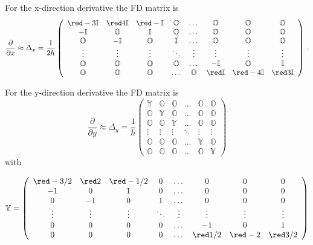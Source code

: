 For the x-direction derivative the FD matrix is
\begin{equation} \label{eq_FDmatrix_der1_y}
	\frac{\partial }{\partial x} \approx \Delta_x= \frac{1}{2h}\left(\begin{array}{cccccccc}
		\red -3\mathbb{I} & \red 4\mathbb{I} & \red-\mathbb{I}& \mathbb{O}& \dots&\mathbb{O} &\mathbb{O} &\mathbb{O}\\
		-\mathbb{I}&\mathbb{O} &  \mathbb{I}& \mathbb{O}&\dots&\mathbb{O}&  \mathbb{O}&\mathbb{O}\\
		\mathbb{O}& -\mathbb{I}&\mathbb{O} & \mathbb{I}& \dots & \mathbb{O}&  \mathbb{O}&  \mathbb{O}\\
		\vdots&\vdots&\vdots&\ddots &\vdots&\vdots&\vdots&\vdots\\
		\mathbb{O}&\mathbb{O}&\mathbb{O}&\mathbb{O}&\dots & -\mathbb{I}&  \mathbb{O} & \mathbb{I} \\
		\mathbb{O}&\mathbb{O}&\mathbb{O}&\dots & \mathbb{O}&\red\mathbb{I} &\red-4\mathbb{I}& \red3\mathbb{I}
	\end{array}\right) \,.
\end{equation}


For the y-direction derivative the FD matrix is
\begin{equation} \label{eq_FDmatrix_der1_y}
	\frac{\partial }{\partial y} \approx \Delta_y= \frac{1}{h}\left(\begin{array}{cccccc}
		\mathbb{Y} & \mathbb{O} & \mathbb{O}& \dots&\mathbb{O} &\mathbb{O}\\
		\mathbb{O}&\mathbb{Y} &  \mathbb{O}& \dots&\mathbb{O}&\mathbb{O}\\
		\mathbb{O}&\mathbb{O}&\mathbb{Y} & \dots &  \mathbb{O}&\mathbb{O}\\
		\vdots&\vdots&\vdots&\ddots &\vdots&\vdots\\
		\mathbb{O}&\mathbb{O}&\mathbb{O}&\dots &\mathbb{Y} & \mathbb{O} \\
		\mathbb{O}&\mathbb{O}&\mathbb{O}&\dots &\mathbb{O}&\mathbb{Y}
	\end{array}\right)
\end{equation}
with

\begin{equation}
	\mathbb{Y} = \left(\begin{array}{cccccccc}
		\red -3/2 &\red 2 &\red -1/2  &  0 & \dots & 0 & 0 &  0 \\
		-1 & 0 &  1& 0 & \dots& 0 & 0 & 0\\
		0 &-1&0 & 1 & \dots & 0 & 0 & 0\\
		\vdots&\vdots&\vdots&\ddots &\vdots&\vdots&\vdots&\vdots\\
		0 & 0 & 0 &0 &  \dots & -1 & 0 & 1 \\
		0 & 0 & 0 &0 &  \dots &\red 1/2 &\red-2 &\red 3/2 
	\end{array}\right)
\end{equation}








\cleardoublepage

